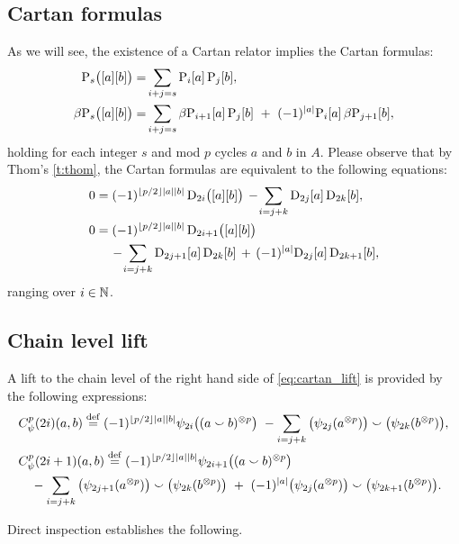 \subsection{Cartan formulas}

As we will see, the existence of a Cartan relator implies the Cartan formulas:
\begin{align*}
	\mathrm{P}_s\big([a][b]\big) =&
	\sum_{i+j=s} \mathrm{P}_i[a] \, \mathrm{P}_j[b], \\
	\beta\mathrm{P}_s\big([a][b]\big) =&
	\sum_{i+j=s} \beta\mathrm{P}_{i+1}[a] \, \mathrm{P}_j[b] \ +\ (-1)^{\lvert a\rvert} \mathrm{P}_i[a] \, \beta\mathrm{P}_{j+1}[b],
\end{align*}
holding for each integer $s$ and mod $p$ cycles $a$ and $b$ in $A$.
Please observe that by Thom's \cref{t:thom}, the Cartan formulas are equivalent to the following equations:
\begin{equation}\label{eq:cartan_lift}
	\begin{split}
		0 &= (-1)^{\lfloor p/2\rfloor\lvert a\rvert\lvert b\rvert} \, \mathrm{D}_{2i}\big([a][b]\big) \,-\!
		\sum_{i=j+k} \mathrm{D}_{2j}[a] \, \mathrm{D}_{2k}[b], \\
		0 &= (-1)^{\lfloor p/2\rfloor\lvert a\rvert\lvert b\rvert} \, \mathrm{D}_{2i+1}\big([a][b]\big) \\ & \quad
		\,-\!\sum_{i=j+k} \mathrm{D}_{2j+1}[a] \, \mathrm{D}_{2k}[b] \, +\, (-1)^{\lvert a\rvert}\mathrm{D}_{2j}[a] \, \mathrm{D}_{2k+1}[b],
	\end{split}
\end{equation}
ranging over $i \in \mathbb{N}$.

\subsection{Chain level lift}

A lift to the chain level of the right hand side of \cref{eq:cartan_lift} is provided by the following expressions:
\begin{align*}
	&C_\psi^p(2i)(a,b) \stackrel{\mathrm{def}}{=} (-1)^{\lfloor p/2\rfloor\lvert a\rvert\lvert b\rvert} \psi_{2i}\big((a \smallsmile b)^{\otimes p}\big) \ -
	\sum_{i=j+k}\big(\psi_{2j}(a^{\otimes p})\big) \smallsmile \big(\psi_{2k}(b^{\otimes p})\big), \\
	&C_\psi^p(2i+1)(a,b) \stackrel{\mathrm{def}}{=} (-1)^{\lfloor p/2\rfloor\lvert a\rvert\lvert b\rvert} \psi_{2i+1}\big((a \smallsmile b)^{\otimes p}\big) \\
	&\quad -\sum_{i=j+k} \big(\psi_{2j+1}(a^{\otimes p})\big) \smallsmile \big(\psi_{2k}(b^{\otimes p})\big)\ +\
	(-1)^{\lvert a\rvert}\big(\psi_{2j}(a^{\otimes p})\big) \smallsmile \big(\psi_{2k+1}(b^{\otimes p})\big).
\end{align*}

Direct inspection establishes the following.


